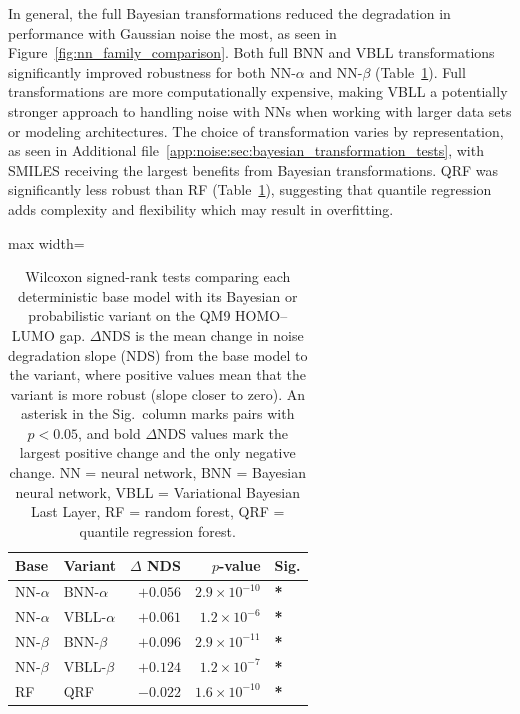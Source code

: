 In general, the full Bayesian transformations reduced the degradation in performance with Gaussian noise the most, as seen in Figure~\ref{fig:nn_family_comparison}. Both full BNN and VBLL transformations significantly improved robustness for both NN-$\alpha$ and NN-$\beta$ (Table~\ref{tab:wilcoxon_bnn}). Full transformations are more computationally expensive, making VBLL a potentially stronger approach to handling noise with NNs when working with larger data sets or modeling architectures. The choice of transformation varies by representation, as seen in Additional file~\ref{app:noise:sec:bayesian_transformation_tests}, with SMILES receiving the largest benefits from Bayesian transformations. QRF was significantly less robust than RF (Table~\ref{tab:wilcoxon_bnn}), suggesting that quantile regression adds complexity and flexibility which may result in overfitting.

\begin{table}[htbp]
\centering
\small
\begin{adjustbox}{max width=\textwidth}
\begin{tabular}{llrrl}
\toprule
\textbf{Base} & \textbf{Variant} & \textbf{$\Delta$ NDS} & \textbf{$p$-value} & \textbf{Sig.} \\
\midrule
NN-$\alpha$ & BNN-$\alpha$ & $+0.056$ & $2.9 \times 10^{-10}$ & \textbf{*} \\
NN-$\alpha$ & VBLL-$\alpha$ & $+0.061$ & $1.2 \times 10^{-6}$ & \textbf{*} \\
NN-$\beta$ & BNN-$\beta$ & $+0.096$ & $2.9 \times 10^{-11}$ & \textbf{*} \\
NN-$\beta$ & VBLL-$\beta$ & $\mathbf{+0.124}$ & $1.2 \times 10^{-7}$ & \textbf{*} \\
RF  & QRF  & $\mathbf{-0.022}$ & $1.6 \times 10^{-10}$ & \textbf{*} \\
\bottomrule
\end{tabular}
\end{adjustbox}
\caption[Wilcoxon signed-rank tests of probabilistic variants on QM9.]{Wilcoxon signed-rank tests comparing each deterministic base model with its Bayesian or probabilistic variant on the QM9 HOMO--LUMO gap. $\Delta$NDS is the mean change in noise degradation slope (NDS) from the base model to the variant, where positive values mean that the variant is more robust (slope closer to zero). An asterisk in the Sig.\ column marks pairs with $p < 0.05$, and bold $\Delta$NDS values mark the largest positive change and the only negative change. NN = neural network, BNN = Bayesian neural network, VBLL = Variational Bayesian Last Layer, RF = random forest, QRF = quantile regression forest.}
\label{tab:wilcoxon_bnn}
\end{table}

